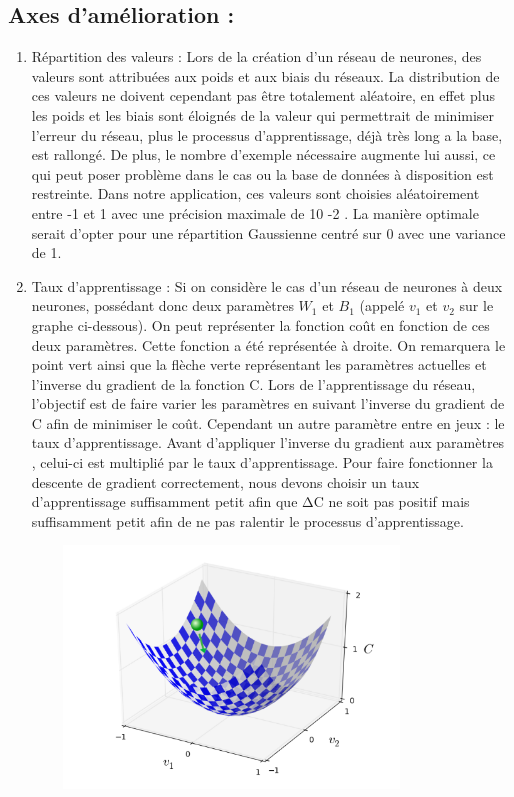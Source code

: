 \documentclass{article}
\begin{document}
\subsection{Axes d'amélioration :}
	\begin{enumerate}
			\item Répartition des valeurs :
			Lors de la création d'un réseau de neurones, des valeurs sont attribuées aux poids et aux biais du réseaux. La distribution de ces valeurs ne doivent cependant pas être totalement aléatoire, en effet plus les poids et les biais sont éloignés de la valeur qui permettrait de minimiser l'erreur du réseau, plus le processus d'apprentissage, déjà très long a la base, est rallongé. 
De plus, le nombre d'exemple nécessaire augmente lui aussi, ce qui peut poser problème dans le cas ou la base de données à disposition est restreinte. 
Dans notre application, ces valeurs sont choisies aléatoirement entre -1 et 1 avec une précision maximale de 10 -2 . La manière optimale serait d'opter pour une répartition Gaussienne centré sur 0 avec une variance de 1.
			\item Taux d'apprentissage :
			Si on considère le cas d'un réseau de neurones à deux neurones, possédant donc deux paramètres
$W_1$ et $B_1$ (appelé $v_1$ et $v_2$ sur le graphe ci-dessous). On peut représenter la fonction coût en fonction de ces
deux paramètres. Cette fonction a été représentée à droite. On remarquera le point vert ainsi que la flèche verte représentant les paramètres actuelles et l'inverse du gradient de la fonction C.
Lors de l'apprentissage du réseau, l'objectif est de faire varier les paramètres en suivant l'inverse du gradient de C afin de minimiser le coût.
Cependant un autre paramètre entre en jeux : le taux d'apprentissage. Avant d'appliquer l'inverse du gradient aux paramètres , celui-ci est multiplié par le taux  d'apprentissage. 
Pour faire fonctionner la descente de gradient correctement, nous devons choisir un taux d'apprentissage suffisamment petit afin que ΔC ne soit pas positif mais suffisamment petit afin de ne pas ralentir le processus d'apprentissage.
				\begin{center} 
				\includegraphics[height=244, width=400]{graphe.PNG}

\end{center}
\end{enumerate}
\end{document}
